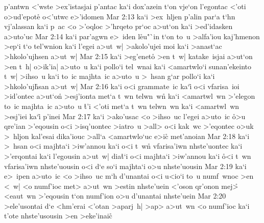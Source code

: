 p'antwn
<'wste
>ex'istasjai
p'antac
ka`i
dox'azein
t`on
vje`on
l'egontac
<'oti
o>ud'epote\r{}
o<'utwc
e>'idomen\bibvsend
\vs Mar 2:13
ka`i
>ex~hljen
p'alin
par`a
t`hn
vj'alassan
ka`i
p~ac
<o
>'oqloc
>'hrqeto
pr`oc
a>ut`on
ka`i
>ed'idasken
a>uto'uc\bibvsend
\vs Mar 2:14
ka`i
par'agwn
e>~iden
l\r{e}u"`in
t`on
to~u
>alfa'iou
kaj'hmenon
>ep`i
t`o
tel'wnion
ka`i
l'egei
a>ut~w|
>akolo'ujei
moi
ka`i
>anast`ac
>hkolo'ujhsen
a>ut~w|\bibvsend
\vs Mar 2:15
ka`i
>eg'eneto\r{}
>en
t~w|
katake~isjai
a>ut`on
>en
t~h|
o>ik'ia|
a>uto~u
ka`i
pollo`i
tel~wnai
ka`i
<amartwlo`i
sunan'ekeinto
t~w|
>ihso~u
ka`i
to~ic
majhta~ic
a>uto~u
>~hsan
g`ar
pollo`i
ka`i
>hkolo'uj\r{h}san
a>ut~w|\bibvsend
\vs Mar 2:16
ka`i
o<i
grammate~ic
ka`i\r{}
o<i
vfarisa~ioi
>id'ontec
a>ut`on\r{}
>esj'ionta
met`a
t~wn
telwn~wn\r{}
ka`i
<amartwl~wn
>'elegon
to~ic
majhta~ic
a>uto~u
\r{t}'i
<'oti
met`a
t~wn
telwn~wn
ka`i
<amartwl~wn
>esj'iei
ka`i\r{}
p'inei\bibvsend
\vs Mar 2:17
ka`i
>ako'usac
<o
>ihso~uc
l'egei
a>uto~ic
\r{o}>u
qre'ian
>'eqousin
o<i
>isq'uontec
>iatro~u
>all>
o<i
kak~wc
>'eqontec
o>uk
>~hljon
kal'esai
dika'iouc
>all`a
<amartwlo`uc
e>ic\r{}
met'anoian\bibvsend
\vs Mar 2:18
ka`i
>~hsan
o<i
majhta`i
>iw'annou
ka`i
o<i
t~wn\r{}
vfarisa'iwn
nhste'uontec
ka`i
>'erqontai
ka`i
l'egousin
a>ut~w|
dia\r{t}`i
o<i
majhta`i
>iw'annou
ka`i
\r{o}<i
t~wn
vfarisa'iwn
nhste'uousin
o<i
d`e
so`i
majhta`i
o>u
nhste'uousin\bibvsend
\vs Mar 2:19
ka`i
e>~ipen
a>uto~ic
<o
>ihso~uc
m`h
d'unantai
o<i
u<io`i
to~u
numf~wnoc
>en
<~w|
<o
numf'ioc
met>
a>ut~wn
>estin
nhste'uein
<'oson
qr'onon
mej>\r{}
<eaut~wn
>'eqousin
t`on
numf'ion
o>u
d'unantai
nhste'uein\bibvsend
\vs Mar 2:20
>ele'usontai
d`e
<hm'erai
<'otan
>aparj~h|
>ap>
a>ut~wn
<o
numf'ioc
ka`i
t'ote
nhste'usousin
>en
>eke'inaic\r{}
